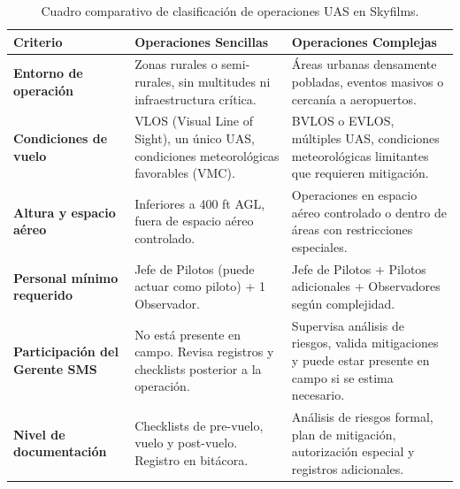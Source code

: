 \begin{table}[H]
\centering
\renewcommand{\arraystretch}{1.3}
\begin{tabular}{|p{4cm}|p{5cm}|p{5cm}|}
\hline
\textbf{Criterio} & \textbf{Operaciones Sencillas} & \textbf{Operaciones Complejas} \\ \hline
\textbf{Entorno de operación} & 
Zonas rurales o semi-rurales, sin multitudes ni infraestructura crítica. & 
Áreas urbanas densamente pobladas, eventos masivos o cercanía a aeropuertos. \\ \hline

\textbf{Condiciones de vuelo} & 
VLOS (Visual Line of Sight), un único UAS, condiciones meteorológicas favorables (VMC). & 
BVLOS o EVLOS, múltiples UAS, condiciones meteorológicas limitantes que requieren mitigación. \\ \hline

\textbf{Altura y espacio aéreo} & 
Inferiores a 400 ft AGL, fuera de espacio aéreo controlado. & 
Operaciones en espacio aéreo controlado o dentro de áreas con restricciones especiales. \\ \hline

\textbf{Personal mínimo requerido} & 
Jefe de Pilotos (puede actuar como piloto) + 1 Observador. & 
Jefe de Pilotos + Pilotos adicionales + Observadores según complejidad. \\ \hline

\textbf{Participación del Gerente SMS} & 
No está presente en campo. Revisa registros y checklists posterior a la operación. & 
Supervisa análisis de riesgos, valida mitigaciones y puede estar presente en campo si se estima necesario. \\ \hline

\textbf{Nivel de documentación} & 
Checklists de pre-vuelo, vuelo y post-vuelo. Registro en bitácora. & 
Análisis de riesgos formal, plan de mitigación, autorización especial y registros adicionales. \\ \hline
\end{tabular}
\caption{Cuadro comparativo de clasificación de operaciones UAS en Skyfilms.}
\end{table}

